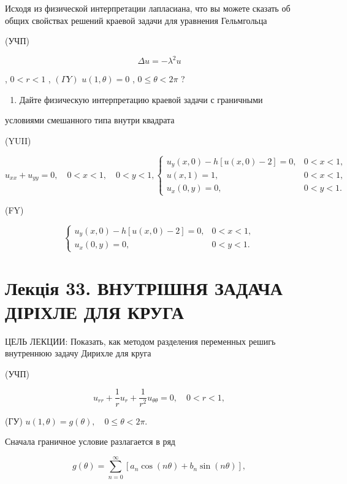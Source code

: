 \documentclass[
  ukrainian,
]{article}
\providecommand{\tightlist}{%
  \setlength{\itemsep}{0pt}\setlength{\parskip}{0pt}}
\begin{document}
Исходя из физической интерпретации лапласиана, что вы можете сказать об
общих свойствах решений краевой задачи для уравнения Гельмгольца

(УЧП)

\[
\Delta u = -\lambda^2 u
\]

, \(0 < r < 1\) , \((\Gamma Y)\) \(u(1, \theta) = 0\) ,
\(0 \le \theta < 2\pi\) ?

\begin{enumerate}
\def\labelenumi{\arabic{enumi}.}
\setcounter{enumi}{5}
\tightlist
\item
  Дайте физическую интерпретацию краевой задачи с граничными
\end{enumerate}

условиями смешанного типа внутри квадрата

(YUII)

\[
u_{xx} + u_{yy} = 0, \quad 0 < x < 1, \quad 0 < y < 1,
\begin{cases} u_y(x, 0) - h[u(x, 0) - 2] = 0, & 0 < x < 1, \\ u(x, 1) = 1, & 0 < x < 1, \\ u_x(0, y) = 0, & 0 < y < 1. \end{cases}
\]

(FY)

\[
\begin{cases} u_y(x, 0) - h[u(x, 0) - 2] = 0, & 0 < x < 1, \\ u_x(0, y) = 0, & 0 < y < 1. \end{cases}
\]

\section{Лекція 33. ВНУТРІШНЯ ЗАДАЧА ДІРІХЛЕ ДЛЯ
КРУГА}\label{ux43bux435ux43aux446ux456ux44f-33.-ux432ux43dux443ux442ux440ux456ux448ux43dux44f-ux437ux430ux434ux430ux447ux430-ux434ux456ux440ux456ux445ux43bux435-ux434ux43bux44f-ux43aux440ux443ux433ux430}

ЦЕЛЬ ЛЕКЦИИ: Показать, как методом разделения переменных решигь
внутреннюю задачу Дирихле для круга

(УЧП)

\[
u_{rr} + \frac{1}{r} u_r + \frac{1}{r^2} u_{\theta\theta} = 0, \quad 0 < r < 1,
\]

(ГУ) \(u(1, \theta) = g(\theta), \quad 0 \le \theta < 2\pi.\)

Сначала граничное условие разлагается в ряд

\[
g(\theta) = \sum_{n=0}^{\infty} [a_n \cos(n\theta) + b_n \sin(n\theta)],
\]
\end{document}
